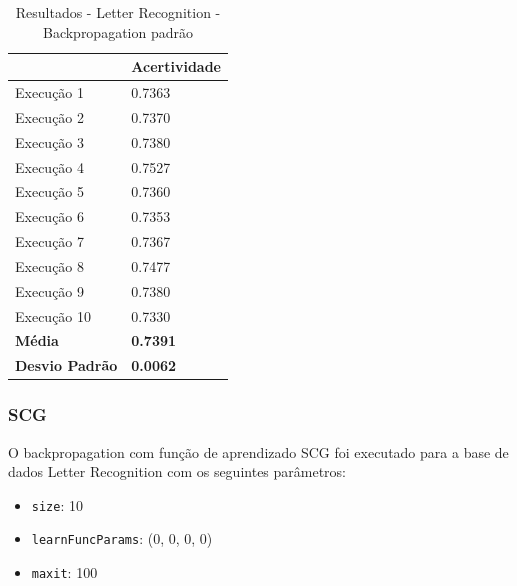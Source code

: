 \begin{table}[h!]
\centering
\caption{Resultados - Letter Recognition - Backpropagation padrão}
\label{tabela-resultado-letter-recognition-backpropagation-padrao}
\begin{tabular}{ll}
\toprule
                       & \textbf{Acertividade}       \\ \midrule
Execução 1             & 0.7363          \\
Execução 2             & 0.7370          \\
Execução 3             & 0.7380          \\
Execução 4             & 0.7527           \\
Execução 5             & 0.7360          \\
Execução 6             & 0.7353           \\
Execução 7             & 0.7367           \\
Execução 8             & 0.7477          \\
Execução 9             & 0.7380           \\
Execução 10            & 0.7330           \\ \bottomrule
\textbf{Média}         & \textbf{0.7391} \\
\textbf{Desvio Padrão} & \textbf{0.0062}
\end{tabular}
\end{table}

%

\subsubsection{SCG}

O backpropagation com função de aprendizado SCG foi executado para a base de dados Letter Recognition com os seguintes parâmetros:

\begin{itemize}
	\item \texttt{size}: 10
	\item \texttt{learnFuncParams}: (0, 0, 0, 0)
	\item \texttt{maxit}: 100
\end{itemize}

